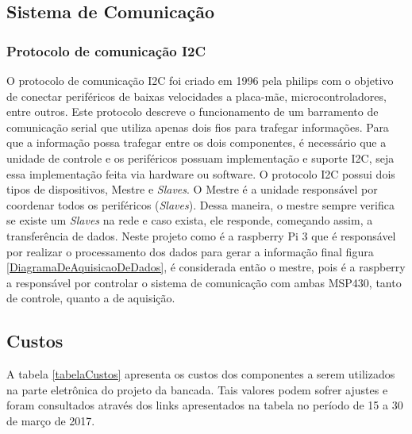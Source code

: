 \subsection{Sistema de Comunicação}

\subsubsection{Protocolo de comunicação I2C}

O protocolo de comunicação I2C foi criado em 1996 pela philips \cite{benincasa2011desenvolvimento} com o objetivo de conectar periféricos de baixas velocidades a placa-mãe, microcontroladores, entre outros. Este protocolo descreve o funcionamento de um barramento de comunicação serial que utiliza apenas dois fios para trafegar informações. Para que a informação possa trafegar entre os dois componentes, é necessário que a unidade de controle e os periféricos possuam implementação e suporte I2C, seja essa implementação feita via hardware ou software. 
O protocolo I2C possui dois tipos de dispositivos, Mestre e \textit{Slaves}. O Mestre é a unidade responsável por coordenar todos os periféricos (\textit{Slaves}). Dessa maneira, o mestre sempre verifica se existe um \textit{Slaves} na rede e caso exista, ele responde, começando assim, a transferência de dados.
Neste projeto como é a raspberry Pi 3 que é responsável por realizar o processamento dos dados para gerar a informação final figura \ref{DiagramaDeAquisicaoDeDados}, é considerada então o mestre, pois é a raspberry a responsável por controlar o sistema de comunicação com ambas MSP430, tanto de controle, quanto a de aquisição.


\subsection{Custos}

A tabela \ref{tabelaCustos} apresenta os custos dos componentes a serem utilizados na parte eletrônica do projeto da bancada. Tais valores podem sofrer ajustes e foram consultados através dos links apresentados na tabela no período de 15 a 30 de março de 2017. 


